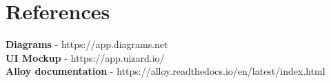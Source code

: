 \documentclass[12pt, a4paper]{report}
\begin{document}
\chapter{References}

    \textbf{Diagrams} - https://app.diagrams.net
    \\
    \textbf{UI Mockup} - https://app.uizard.io/
    \\
    \textbf{Alloy documentation} - https://alloy.readthedocs.io/en/latest/index.html
\end{document}
